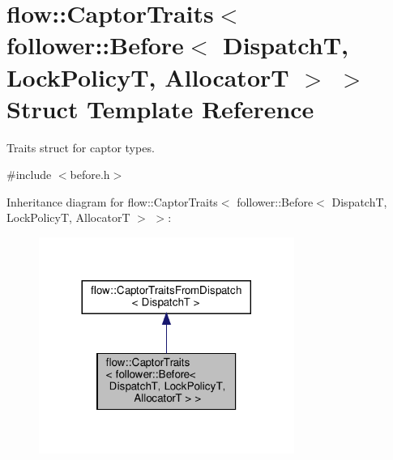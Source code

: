 \hypertarget{structflow_1_1_captor_traits_3_01follower_1_1_before_3_01_dispatch_t_00_01_lock_policy_t_00_01_allocator_t_01_4_01_4}{}\section{flow\+:\+:Captor\+Traits$<$ follower\+:\+:Before$<$ DispatchT, Lock\+PolicyT, AllocatorT $>$ $>$ Struct Template Reference}
\label{structflow_1_1_captor_traits_3_01follower_1_1_before_3_01_dispatch_t_00_01_lock_policy_t_00_01_allocator_t_01_4_01_4}


Traits struct for captor types.  




{\ttfamily \#include $<$before.\+h$>$}



Inheritance diagram for flow\+:\+:Captor\+Traits$<$ follower\+:\+:Before$<$ DispatchT, Lock\+PolicyT, AllocatorT $>$ $>$\+:\nopagebreak
\begin{figure}[H]
\begin{center}
\leavevmode
\includegraphics[width=236pt]{structflow_1_1_captor_traits_3_01follower_1_1_before_3_01_dispatch_t_00_01_lock_policy_t_00_01_a66c944242782a94235a0a3ed2ee80428}
\end{center}
\end{figure}



